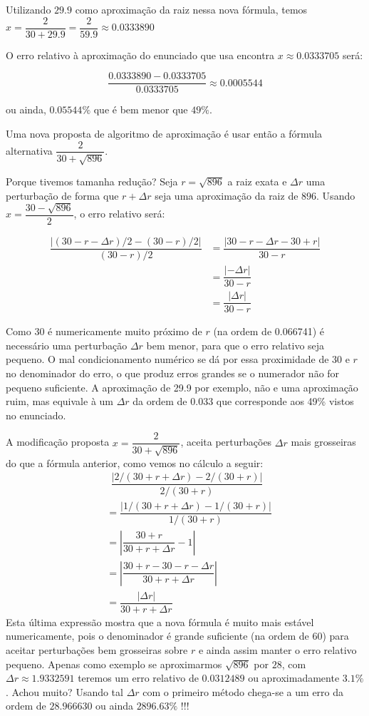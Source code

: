 \documentclass[12pt]{article}
\begin{document}
Utilizando $29.9$ como aproximação da raiz nessa nova fórmula, temos $x=\dfrac{2}{30+29.9}=\dfrac{2}{59.9}\approx 0.0333890$

O erro relativo à aproximação do enunciado que usa encontra $x\approx0.0333705$ será:

\[\dfrac{0.0333890-0.0333705}{0.0333705}\approx0.0005544\] 

ou ainda, $0.05544\%$ que é bem menor que $49\%$.

Uma nova proposta de algoritmo de aproximação é usar então a fórmula alternativa $\dfrac{2}{30+\sqrt{896}}$.

Porque tivemos tamanha redução? Seja $r=\sqrt{896}$ a raiz exata e $\Delta r$ uma perturbação de forma que $r+\Delta r$ seja uma aproximação da raiz de $896$. Usando $x=\dfrac{30-\sqrt{896}}{2}$, o erro relativo será:

\begin{align*}
	\dfrac{|(30-r-\Delta r)/2-(30-r)/2|}{(30-r)/2}&=\dfrac{|30-r-\Delta r-30+r|}{30-r}\\
	&=\dfrac{|-\Delta r|}{30-r}\\
	&=\dfrac{|\Delta r|}{30-r}
\end{align*}

Como 30 é numericamente muito próximo de $r$ (na ordem de 0.066741) é necessário uma perturbação $\Delta r$ bem menor, para que o erro relativo seja pequeno. O mal condicionamento numérico se dá por essa proximidade de $30$ e $r$ no denominador do erro, o que produz erros grandes se o numerador não for pequeno suficiente. A aproximação de 29.9 por exemplo, não e uma aproximação ruim, mas equivale à um $\Delta r$ da ordem de 0.033 que corresponde aos 49\% vistos no enunciado.

A modificação proposta $x=\dfrac{2}{30+\sqrt{896}}$, aceita perturbações $\Delta r$ mais grosseiras do que a fórmula anterior, como vemos no cálculo a seguir:
\begin{align*}
&~~\dfrac{|2/(30+r+\Delta r)-2/(30+r)|}{2/(30+r)}\\
	&=\dfrac{|1/(30+r+\Delta r)-1/(30+r)|}{1/(30+r)}\\
	&=\left|\dfrac{30+r}{30+r+\Delta r}-1\right|\\
	&=\left|\dfrac{30+r-30-r-\Delta r}{30+r+\Delta r}\right|\\
	&=\dfrac{|\Delta r|}{30+r+\Delta r}
\end{align*}
Esta última expressão mostra que a nova fórmula é muito mais estável numericamente, pois o denominador é grande suficiente (na ordem de 60) para aceitar perturbações bem grosseiras sobre $r$ e ainda assim manter o erro relativo pequeno. Apenas como exemplo se aproximarmos $\sqrt{896}$ por $28$, com $\Delta r \approx 1.9332591$ teremos um erro relativo de $0.0312489$ ou aproximadamente $3.1\%$. Achou muito? Usando tal $\Delta r$ com o primeiro método chega-se a um erro da ordem de $28.966630$ ou ainda $2896.63\%$ !!!
\end{document}
